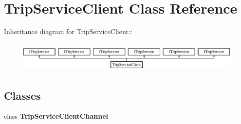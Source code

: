 \hypertarget{class_trip_service_client}{
\section{TripServiceClient Class Reference}
\label{class_trip_service_client}
}
Inheritance diagram for TripServiceClient::\begin{figure}[H]
\begin{center}
\leavevmode
\includegraphics[height=1.58192cm]{class_trip_service_client}
\end{center}
\end{figure}
\subsection*{Classes}
\begin{DoxyCompactItemize}
\item 
class {\bfseries TripServiceClientChannel}
\end{DoxyCompactItemize}
